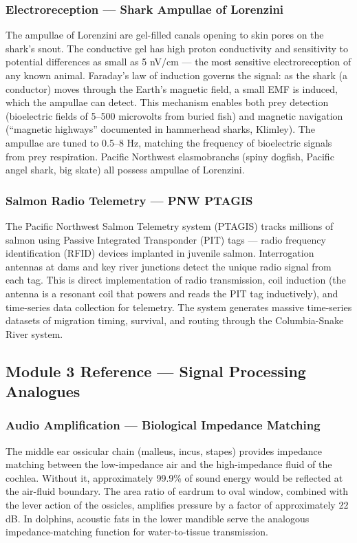 \documentclass[11pt,letterpaper]{article}
\begin{document}
\subsubsection{Electroreception --- Shark Ampullae of Lorenzini}
The ampullae of Lorenzini are gel-filled canals opening to skin pores on the shark's snout. The conductive gel has high proton conductivity and sensitivity to potential differences as small as 5 nV/cm --- the most sensitive electroreception of any known animal. Faraday's law of induction governs the signal: as the shark (a conductor) moves through the Earth's magnetic field, a small EMF is induced, which the ampullae can detect. This mechanism enables both prey detection (bioelectric fields of 5--500 microvolts from buried fish) and magnetic navigation (``magnetic highways'' documented in hammerhead sharks, Klimley). The ampullae are tuned to 0.5--8 Hz, matching the frequency of bioelectric signals from prey respiration. Pacific Northwest elasmobranchs (spiny dogfish, Pacific angel shark, big skate) all possess ampullae of Lorenzini.

\subsubsection{Salmon Radio Telemetry --- PNW PTAGIS}
The Pacific Northwest Salmon Telemetry system (PTAGIS) tracks millions of salmon using Passive Integrated Transponder (PIT) tags --- radio frequency identification (RFID) devices implanted in juvenile salmon. Interrogation antennas at dams and key river junctions detect the unique radio signal from each tag. This is direct implementation of radio transmission, coil induction (the antenna is a resonant coil that powers and reads the PIT tag inductively), and time-series data collection for telemetry. The system generates massive time-series datasets of migration timing, survival, and routing through the Columbia-Snake River system.

\subsection{Module 3 Reference --- Signal Processing Analogues}

\subsubsection{Audio Amplification --- Biological Impedance Matching}
The middle ear ossicular chain (malleus, incus, stapes) provides impedance matching between the low-impedance air and the high-impedance fluid of the cochlea. Without it, approximately 99.9\% of sound energy would be reflected at the air-fluid boundary. The area ratio of eardrum to oval window, combined with the lever action of the ossicles, amplifies pressure by a factor of approximately 22 dB. In dolphins, acoustic fats in the lower mandible serve the analogous impedance-matching function for water-to-tissue transmission.
\end{document}
